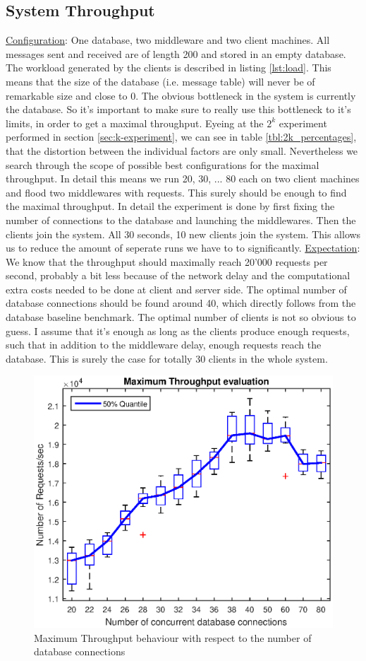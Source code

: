 \documentclass[11pt]{article}
\begin{document}
\subsection{System Throughput}\label{sec:system-throughput}
\underline{Configuration}: One database, two middleware and two client machines. All messages sent and received are of length 200 and stored in an empty database. The workload generated by the clients is described in listing \ref{lst:load}. This means that the size of the database (i.e. message table) will never be of remarkable size and close to 0. The obvious bottleneck in the system is currently the database. So it's important to make sure to really use this bottleneck to it's limits, in order to get a maximal throughput. Eyeing at the $2^k$ experiment performed in section \ref{sec:k-experiment}, we can see in table \ref{tbl:2k_percentages}, that the distortion between the individual factors are only small. Nevertheless we search through the scope of possible best configurations for the maximal throughput. In detail this means we run 20, 30, ... 80 each on two client machines and flood two middlewares with requests. This surely should be enough to find the maximal throughput. In detail the experiment is done by first fixing the number of connections to the database and launching the middlewares. Then the clients join the system. All 30 seconds, 10 new clients join the system. This allows us to reduce the amount of seperate runs we have to to significantly.
\newline\underline{Expectation}: We know that the throughput should maximally reach 20'000 requests per second, probably a bit less because of the network delay and the computational extra costs needed to be done at client and server side. The optimal number of database connections should be found around 40, which directly follows from the database baseline benchmark. The optimal number of clients is not so obvious to guess. I assume that it's enough as long as the clients produce enough requests, such that in addition to the middleware delay, enough requests reach the database. This is surely the case for totally 30 clients in the whole system.
\begin{figure}[!htb]
\centering
\includegraphics[width=0.7\linewidth]{figures/max_tp}
\caption{Maximum Throughput behaviour with respect to the number of database connections}
\label{fig:max_tp}
\end{figure}
\end{document}
